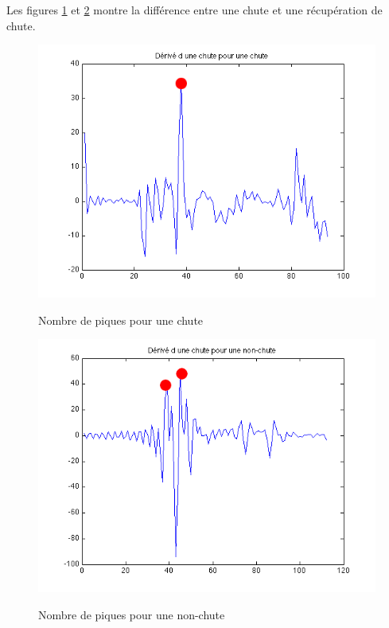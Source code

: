 \documentclass[12pt,letterpaper]{article}
\begin{document}
Les figures \ref{fig:chute} et \ref{fig:nonchute} montre la différence entre une chute et une récupération de chute.

\begin{figure}[htp]
\centering
\includegraphics{image/piques_chute.png}
\label{fig:chute}
\caption{Nombre de piques pour une chute}
\end{figure}


\begin{figure}[htp]
\centering
\includegraphics{image/piques_nonchute.png}
\label{fig:nonchute}
\caption{Nombre de piques pour une non-chute}
\end{figure}
\end{document}
